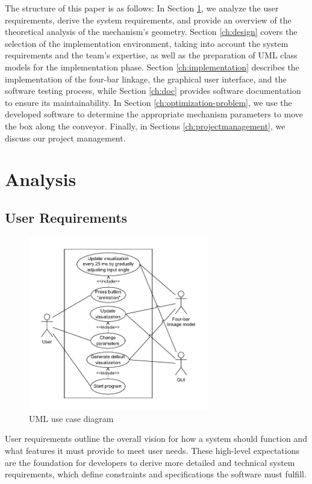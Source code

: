 \documentclass{article}
\begin{document}
The structure of this paper is as follows: In Section \ref{ch:analysis}, we analyze the user requirements, derive the system requirements, and provide an overview of the theoretical analysis of the mechanism’s geometry. Section \ref{ch:design} covers the selection of the implementation environment, taking into account the system requirements and the team's expertise, as well as the preparation of UML class models for the implementation phase. Section \ref{ch:implementation} describes the implementation of the four-bar linkage, the graphical user interface, and the software testing process, while Section \ref{ch:doc} provides software documentation to ensure its maintainability. In Section \ref{ch:optimization-problem}, we use the developed software to determine the appropriate mechanism parameters to move the box along the conveyor. Finally, in Sections \ref{ch:projectmanagement}, we discuss our project management.

\section{Analysis} \label{ch:analysis}

\subsection{User Requirements}

\begin{figure}[h]
	\centering
	\includegraphics[width=0.7\textwidth]{./figures/uml_use_case.pdf}
	\caption{UML use case diagram}
	\label{fig:use_case}
\end{figure}

User requirements outline the overall vision for how a system should function and what features it must provide to meet user needs. These high-level expectations are the foundation for developers to derive more detailed and technical system requirements, which define constraints and specifications the software must fulfill.
\end{document}
